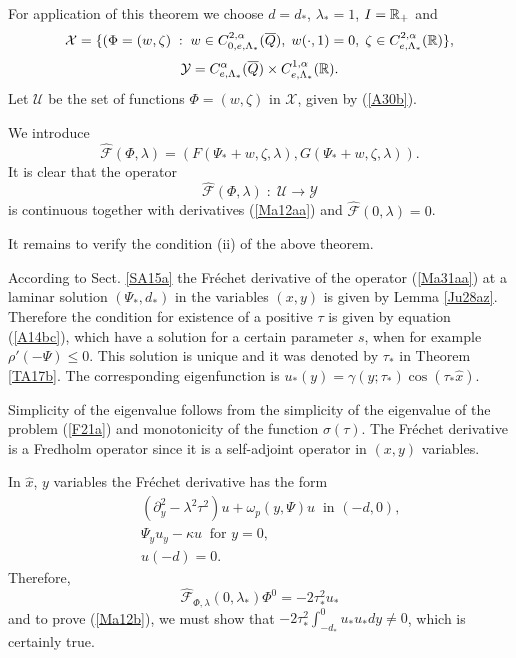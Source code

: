 \documentclass[a4paper,reqno,12pt]{amsart}
\theoremstyle{plain}
\theoremstyle{definition}
\numberwithin{equation}{section}
\begin{document}
For application of this theorem we choose $d=d_*$, $\lambda_*=1$, $I=\Bbb R_+$ and
$$
{\mathcal X}=\{(\Phi=(w,\zeta)\;:\; w\in C^{2,\alpha}_{0,e,\Lambda_*}(\overline{Q}), \;w(\cdot,1)=0,\;\zeta\in C^{2,\alpha}_{e,\Lambda_*}(\Bbb R)\},
$$
$$
{\mathcal Y}=C^{\alpha}_{e,\Lambda_*}(\overline{Q})\times C^{1,\alpha}_{e,\Lambda_*}(\Bbb R).
$$
Let ${\mathcal U}$ be the set of functions $\Phi=(w,\zeta)$ in ${\mathcal X}$, given by (\ref{A30b}).

We introduce
$$
\widehat{\mathcal F}(\Phi,\lambda)=(F(\Psi_*+w,\zeta,\lambda),G(\Psi_*+w,\zeta,\lambda)).
$$
 It is clear that the operator
 \begin{equation}\label{Ma31ab}
 \widehat{\mathcal F}(\Phi,\lambda)\;:\;{\mathcal U}\rightarrow {\mathcal Y}
 \end{equation}
is continuous together with derivatives (\ref{Ma12aa}) and $\widehat{\mathcal F}(0,\lambda)=0$.

It remains to verify the condition (ii) of the above theorem.

According to Sect. \ref{SA15a} the Fr\'{e}chet derivative of the operator (\ref{Ma31aa}) at a laminar solution $(\Psi_*,d_*)$ in the variables $(x,y)$ is given by Lemma \ref{Ju28az}.
Therefore the condition for existence of a positive $\tau$ is given by equation (\ref{A14bc}), which have a solution for a certain parameter $s$, when for example $\rho'(-\Psi)\leq 0$. This solution is unique and it was denoted by $\tau_*$ in Theorem \ref{TA17b}. The corresponding eigenfunction is $u_*(y)=\gamma(y;\tau_*)\cos(\tau_*\hat{x})$.

 Simplicity of the eigenvalue follows from the simplicity of the eigenvalue of the problem (\ref{F21a}) and monotonicity of the function $\sigma(\tau)$.
 The Fr\'{e}chet derivative is a Fredholm operator since it is a self-adjoint operator in $(x,y)$ variables.

 In $\hat{x}$, $y$ variables the Fr\'{e}chet derivative has the form
\begin{eqnarray}\label{A17ca}
&&(\partial_y^2-\lambda^2\tau^2)u+\omega_p(y,\Psi)u
\;\;\mbox{in $(-d,0)$},\nonumber\\
&&\Psi_yu_y-\kappa u\;\;\mbox{for $y=0$},\nonumber\\
&& u(-d)=0.
\end{eqnarray}
Therefore,
$$
\widehat{\mathcal F}_{\Phi,\lambda}(0,\lambda_*)\Phi^0=-2\tau_*^2u_*
$$
and to prove (\ref{Ma12b}), we must show that $-2\tau_*^2\int_{-d_*}^0u_*u_*dy\neq 0$, which is certainly true.
\end{document}
